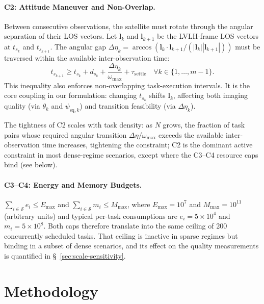 \documentclass[preprint,12pt,authoryear]{elsarticle}
\begin{document}
\paragraph{C2: Attitude Maneuver and Non-Overlap.}
Between consecutive observations, the satellite must rotate through the
angular separation of their LOS vectors. Let $\mathbf{l}_k$ and
$\mathbf{l}_{k+1}$ be the LVLH-frame LOS vectors at $t_{s_k}$ and
$t_{s_{k+1}}$. The angular gap
$\Delta\eta_k = \arccos(\mathbf{l}_k\cdot\mathbf{l}_{k+1}/(|\mathbf{l}_k||\mathbf{l}_{k+1}|))$
must be traversed within the available inter-observation time:
\begin{equation}
t_{s_{k+1}} \geq t_{s_k} + d_{s_k} + \frac{\Delta\eta_k}{\omega_{\max}} + \tau_{\text{settle}} \quad \forall k \in \{1,\ldots,m-1\}.
\label{eq:c2}
\end{equation}
This inequality also enforces non-overlapping task-execution intervals. It is
the core coupling in our formulation: changing $t_{s_k}$ shifts
$\mathbf{l}_k$, affecting both imaging quality (via $\theta_k$ and
$\psi_{\text{sq},k}$) and transition feasibility (via $\Delta\eta_k$).

The tightness of C2 scales with task density: as $N$ grows, the fraction
of task pairs whose required angular transition
$\Delta\eta / \omega_{\max}$ exceeds the available inter-observation
time increases, tightening the constraint; C2 is the dominant active
constraint in most dense-regime scenarios, except where the C3--C4
resource caps bind (see below).

\paragraph{C3--C4: Energy and Memory Budgets.}
$\sum_{i \in \mathcal{S}} e_i \leq E_{\max}$ and
$\sum_{i \in \mathcal{S}} m_i \leq M_{\max}$, where $E_{\max}=10^7$ and
$M_{\max}=10^{11}$ (arbitrary units) and typical per-task consumptions are
$e_i = 5\times10^4$ and $m_i = 5\times10^8$. Both caps therefore translate
into the same ceiling of 200 concurrently scheduled tasks. That ceiling is
inactive in sparse regimes but binding in a subset of dense scenarios, and
its effect on the quality measurements is quantified in
\S~\ref{sec:scale-sensitivity}.
\section{Methodology}
\end{document}

